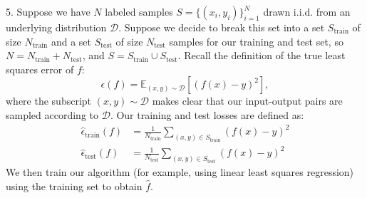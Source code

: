 5. Suppose we have $N$ labeled samples $S = \{(x_i,y_i)\}_{i=1}^N$
drawn i.i.d. from an underlying distribution $\mathcal{D}$. Suppose we
decide to break this set into a set $S_{\textrm{train}}$ of size
$N_{\textrm{train}}$ and a set $S_{\textrm{test}}$ of size
$N_{\textrm{test}}$ samples for our training and test set, so
$N = N_{\textrm{train}} + N_{\textrm{test}}$, and $S = S_{\textrm{train}} \cup S_{\textrm{test}}$.  Recall the definition
of the true least squares error of $f$:
\[
  \epsilon(f) = 
  \mathbb{E}_{(x,y) \sim \mathcal{D}} [ (f(x) -y)^2 ],
\]
where the subscript $(x,y) \sim \mathcal{D}$ makes clear that our
input-output pairs are sampled according to $\mathcal{D}$.
Our training and test losses are defined as:
\begin{align*}
\widehat{\epsilon}_{\textrm{train}}(f) &=
\frac{1}{N _{\textrm{train}}} \sum_{(x,y)\in S_{\textrm{train}}}     (f(x) -y)^2
\\
  \widehat{\epsilon}_{\textrm{test}}(f) &=
  \frac{1}{N _{\textrm{test}}} \sum_{(x,y)\in S_{\textrm{test}}}     (f(x) -y)^2  
\end{align*}
We then train our algorithm (for example, using linear least squares
regression) using the training set to obtain $\widehat{f}$.


